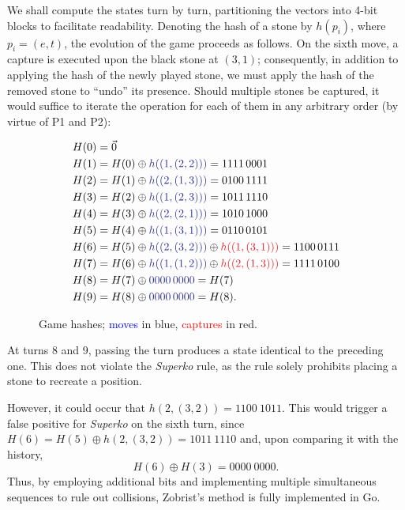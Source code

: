 We shall compute the states turn by turn, partitioning the vectors into 4-bit blocks to facilitate readability. Denoting the hash of a stone by \(h(p_i)\), where \(p_i = (e, t)\), the evolution of the game proceeds as follows. On the sixth move, a capture is executed upon the black stone at \((3,1)\); consequently, in addition to applying the hash of the newly played stone, we must apply the hash of the removed stone to ``undo'' its presence. Should multiple stones be captured, it would suffice to iterate the operation for each of them in any arbitrary order (by virtue of P1 and P2):
\begin{figure}[H]
	\centering
	\begin{align*}
		H(0) &= \vec{0} \\
		H(1) &= H(0) \oplus \textcolor{Blue}{h((1, (2,2)))} = 1111\, 0001 \\
		H(2) &= H(1) \oplus \textcolor{Blue}{h((2, (1,3)))} = 0100\, 1111 \\
		H(3) &= H(2) \oplus \textcolor{Blue}{h((1, (2,3)))}= 1011\, 1110 \\
		H(4) &= H(3) \oplus \textcolor{Blue}{h((2, (2,1)))} = 1010\, 1000 \\
		H(5) &= H(4) \oplus \textcolor{Blue}{h((1, (3,1))) }= 0110\, 0101 \\
		H(6) &= H(5) \oplus \textcolor{Blue}{h((2, (3,2)))} \oplus \textcolor{Red}{h((1, (3,1)))} = 1100\, 0111 \\
		H(7)  &= H(6) \oplus \textcolor{Blue}{h((1, (1,2)))} \oplus \textcolor{Red}{h((2, (1,3)))}= 1111\, 0100 \\
		H(8)  &= H(7) \oplus \textcolor{Blue}{0000\, 0000} = H(7) \\
		H(9)  &= H(8) \oplus  \textcolor{Blue}{0000\, 0000} = H(8).
	\end{align*}
	\caption{Game hashes; \textcolor{Blue}{moves} in blue, \textcolor{Red}{captures} in red.}
\end{figure}
At turns 8 and 9, passing the turn produces a state identical to the preceding one. This does not violate the \textit{Superko} rule, as the rule solely prohibits placing a stone to recreate a position.

However, it could occur that \(h(2,(3,2))=1100\ 1011\). This would trigger a false positive for \textit{Superko} on the sixth turn, since \(H(6)= H(5)\oplus h(2,(3,2)) = 1011\ 1110\) and, upon comparing it with the history,
$$H(6)\oplus H(3)=0000\ 0000.$$
Thus, by employing additional bits and implementing multiple simultaneous sequences to rule out collisions, Zobrist's method is fully implemented in Go.


